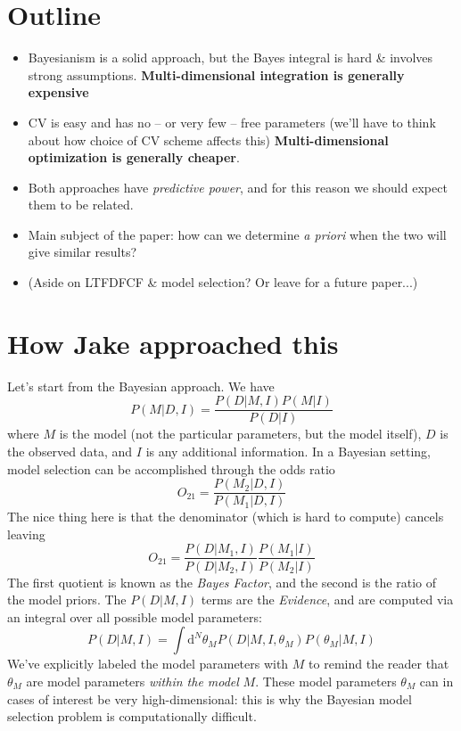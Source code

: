 \documentclass[12pt]{article}
\newcommand{\dd}{\mathrm{d}}
\begin{document}
\section{Outline}
\begin{itemize}
\item Bayesianism is a solid approach, but the Bayes integral is hard \&
  involves strong assumptions. {\bf Multi-dimensional integration
    is generally expensive}
\item CV is easy and has no -- or very few -- free parameters (we'll have to
  think about how choice of CV scheme affects this)
  {\bf Multi-dimensional optimization is generally cheaper}.
\item Both approaches have {\it predictive power}, and for this reason we
  should expect them to be related.
\item Main subject of the paper: how can we determine {\it a priori} when the
  two will give similar results?
\item (Aside on LTFDFCF \& model selection?  Or leave for a future paper...)
\end{itemize}

\section{How Jake approached this}
Let's start from the Bayesian approach.  We have
\begin{equation}
  P(M|D,I) = \frac{P(D|M,I)P(M|I)}{P(D|I)}
\end{equation}
where $M$ is the model (not the particular parameters, but the model itself),
$D$ is the observed data, and $I$ is any additional information.
In a Bayesian setting, model selection can be accomplished through the odds
ratio
\begin{equation}
  O_{21} = \frac{P(M_2|D,I)}{P(M_1|D,I)}
\end{equation}
The nice thing here is that the denominator (which is hard to compute) cancels
leaving
\begin{equation}
  O_{21} = \frac{P(D|M_1,I)}{P(D|M_2,I)}\frac{P(M_1|I)}{P(M_2|I)}
\end{equation}
The first quotient is known as the {\it Bayes Factor}, and the second is the
ratio of the model priors.  The $P(D|M,I)$ terms are the {\it Evidence},
and are computed via an integral over all possible model parameters:
\begin{equation}
  P(D|M, I) = \int \dd^N\theta_M P(D|M, I, \theta_M)P(\theta_M|M, I)
\end{equation}
We've explicitly labeled the model parameters with $M$ to remind the reader
that $\theta_M$ are model parameters {\it within the model} $M$.
These model parameters $\theta_M$ can in cases of interest be
very high-dimensional:
this is why the Bayesian model selection problem is computationally difficult.
\end{document}
